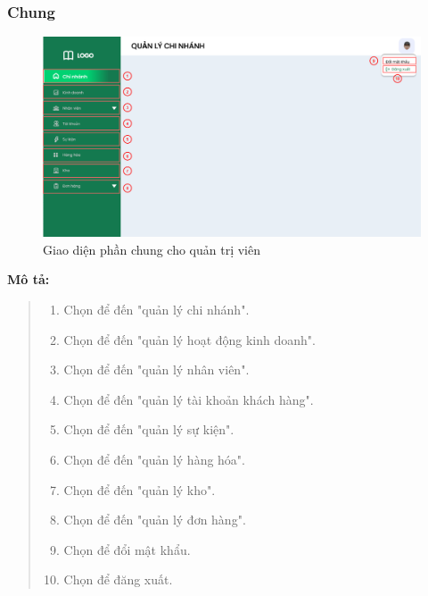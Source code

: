     \subsubsection{Chung}
        \begin{figure}[!htp]
            \centering
            \includegraphics[width=12cm]{img/UI/admin/sidebar.png}
            \newline
            \caption{Giao diện phần chung cho quản trị viên}
        \end{figure}

        \textbf{Mô tả:}  
        \begin{quote}
            \begin{enumerate}
                \item Chọn để đến "quản lý chi nhánh".
                \item Chọn để đến "quản lý hoạt động kinh doanh".
                \item Chọn để đến "quản lý nhân viên".
                \item Chọn để đến "quản lý tài khoản khách hàng".
                \item Chọn để đến "quản lý sự kiện".
                \item Chọn để đến "quản lý hàng hóa".
                \item Chọn để đến "quản lý kho".
                \item Chọn để đến "quản lý đơn hàng".
                \item Chọn để đổi mật khẩu.
                \item Chọn để đăng xuất.
            \end{enumerate}
        \end{quote}
        
